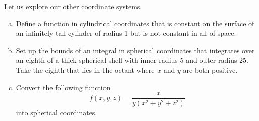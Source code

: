 \documentclass[12pt]{amsbook}
\begin{document}
\newpage
\begin{problem} Let us explore our other coordinate systems.
    \begin{enumerate}[(a)]
        \item Define a function in cylindrical coordinates that is constant on the surface of an infinitely tall cylinder of radius 1 but is not constant in all of space.
        \vspace*{0.25cm}
        \item Set up the bounds of an integral in spherical coordinates that integrates over an eighth of a thick spherical shell with inner radius 5 and outer radius 25. Take the eighth that lies in the octant where $x$ and $y$ are both positive.
        \vspace*{0.25cm}
        \item Convert the following function 
        \[
        f(x,y,z) = \frac{x}{y(x^2+y^2+z^2)}
        \]
        into spherical coordinates.
    \end{enumerate}
\end{problem}
\end{document}
